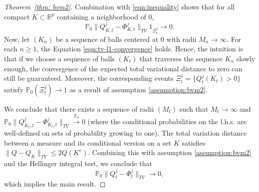 \documentclass[twoside,11pt]{article}
\numberwithin{equation}{section}
\newcommand{\R}{{\mathbb{R}}}
\newcommand\bP{\mathbb{P}}
\newcommand{\pto}{\stackrel{\bP_0}{\to}}
\begin{document}
{\begin{proof}[Theorem~\ref{thm: bvm2}]
Combination with \eqref{eqn:inequality} shows that for all compact $K \subset \R^p$ containing a neighborhood of $0$, 
\begin{equation} \label{eqn:tv-l1-convergence}
    \bP_0 \| Q_{K,t}^j - \Phi_{K,t}^j \|_{TV} 1_{\Xi_t^j} \to 0. 
\end{equation}
Now, let $(K_n)$ be a sequence of balls centered at $0$ with radii $M_n \to \infty$. For each $n \geq 1$, the Equation \eqref{eqn:tv-l1-convergence} holds. Hence, the intuition is that if we choose a sequence of balls $(K_t)$ that traverses the sequence $K_n$ slowly enough, the convergence of the expected total variational distance to zero can still be guaranteed. Moreover, the corresponding events $\Xi_t^j = \{Q_t^j(K_t) > 0\}$ satisfy $\bP_0(\Xi_t^j) \to 1$ as a result of assumption \eqref{assumption:bvm2}.

We conclude that there exists a sequence of radii $(M_t)$ such that $M_t \to \infty$ and $\bP_0 \| Q_{K_t,t}^j - \Phi_{K_t,t}^j \|_{TV} \pto 0$ (where the conditional probabilities on the l.h.s. are well-defined on sets of probability growing to one). The total variation distance between a measure and its conditional version on a set $K$ satisfies $\|Q - Q_K\|_{TV} \leq 2Q(K^c)$. Combining this with assumption \eqref{assumption:bvm2} and the Hellinger integral test, we conclude that 
\begin{equation*}
    \bP_0 \| Q_t^j - \Phi_t^j \|_{TV} \to 0, 
\end{equation*}
which implies the main result.
\end{proof}

}
\end{document}
